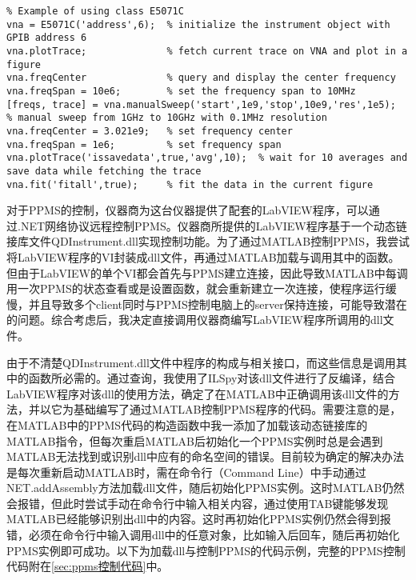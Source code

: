             \begin{lstlisting}
% Example of using class E5071C
vna = E5071C('address',6);	% initialize the instrument object with GPIB address 6
vna.plotTrace;				% fetch current trace on VNA and plot in a figure
vna.freqCenter				% query and display the center frequency
vna.freqSpan = 10e6;		% set the frequency span to 10MHz
[freqs, trace] = vna.manualSweep('start',1e9,'stop',10e9,'res',1e5);	% manual sweep from 1GHz to 10GHz with 0.1MHz resolution
vna.freqCenter = 3.021e9;	% set frequency center
vna.freqSpan = 1e6;			% set frequency span
vna.plotTrace('issavedata',true,'avg',10);	% wait for 10 averages and save data while fetching the trace
vna.fit('fitall',true);		% fit the data in the current figure
            \end{lstlisting}



            对于PPMS的控制，仪器商为这台仪器提供了配套的LabVIEW程序，可以通过.NET网络协议远程控制PPMS。仪器商所提供的LabVIEW程序基于一个动态链接库文件QDInstrument.dll实现控制功能。为了通过MATLAB控制PPMS，我尝试将LabVIEW程序的VI封装成dll文件，再通过MATLAB加载与调用其中的函数。但由于LabVIEW的单个VI都会首先与PPMS建立连接，因此导致MATLAB中每调用一次PPMS的状态查看或是设置函数，就会重新建立一次连接，使程序运行缓慢，并且导致多个client同时与PPMS控制电脑上的server保持连接，可能导致潜在的问题。综合考虑后，我决定直接调用仪器商编写LabVIEW程序所调用的dll文件。

            由于不清楚QDInstrument.dll文件中程序的构成与相关接口，而这些信息是调用其中的函数所必需的。通过查询，我使用了ILSpy对该dll文件进行了反编译，结合LabVIEW程序对该dll的使用方法，确定了在MATLAB中正确调用该dll文件的方法，并以它为基础编写了通过MATLAB控制PPMS程序的代码。需要注意的是，在MATLAB中的PPMS代码的构造函数中我一添加了加载该动态链接库的MATLAB指令，但每次重启MATLAB后初始化一个PPMS实例时总是会遇到MATLAB无法找到或识别dll中应有的命名空间的错误。目前较为确定的解决办法是每次重新启动MATLAB时，需在命令行（Command Line）中手动通过NET.addAssembly方法加载dll文件，随后初始化PPMS实例。这时MATLAB仍然会报错，但此时尝试手动在命令行中输入相关内容，通过使用TAB键能够发现MATLAB已经能够识别出dll中的内容。这时再初始化PPMS实例仍然会得到报错，必须在命令行中输入调用dll中的任意对象，比如输入后回车，随后再初始化PPMS实例即可成功。以下为加载dll与控制PPMS的代码示例，完整的PPMS控制代码附在\ref{sec:ppms控制代码}中。

